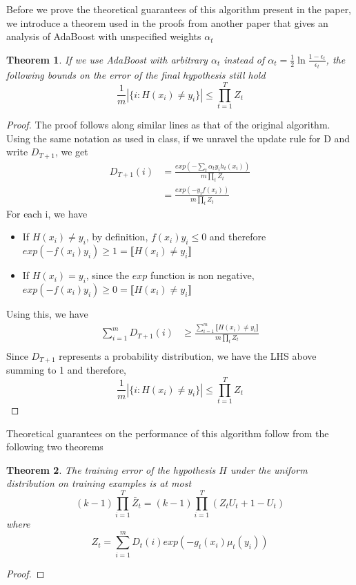 \documentclass[11pt]{article}
\newtheorem{theorem}{Theorem}
\begin{document}
Before we prove the theoretical guarantees of this algorithm present in the paper, we introduce a theorem used in the proofs from another paper that gives an analysis of AdaBoost with unspecified weights $\alpha_t$ \cite{Schapire:1999:IBA:337859.337870}
\begin{theorem}
If we use AdaBoost with arbitrary $\alpha_t$ instead of $\alpha_t = \frac{1}{2} \ln \frac{1-\epsilon_t}{\epsilon_t}$, the following bounds on the error of the final hypothesis still hold
$$\frac{1}{m}|\{i : H(x_i) \neq y_i\}| \le \prod_{t=1}^T Z_t$$
\end{theorem}
\begin{proof}
The proof follows along similar lines as that of the original algorithm. Using the same notation as used in class, if we unravel the update rule for D and write $D_{T+1}$, we get
\begin{align*}
D_{T+1}(i) &= \frac{exp(-\sum_t \alpha_t y_i h_t(x_i))}{m\prod_t Z_t}\\
&= \frac{exp(-y_i f(x_i))}{m \prod_t Z_t}
\end{align*}
For each i, we have
\begin{itemize}
\item If $H(x_i) \neq y_i$, by definition, $f(x_i) y_i \leq 0$ and therefore $exp(-f(x_i) y_i) \ge 1 = \llbracket H(x_i) \neq y_i \rrbracket$
\item If $H(x_i) = y_i$, since the $exp$ function is non negative, $exp(-f(x_i) y_i) \ge 0 = \llbracket H(x_i) \neq y_i \rrbracket$
\end{itemize}
Using this, we have
\begin{align*}
\sum_{i=1}^m D_{T+1}(i) &\ge \frac{\sum_{i=1}^m \llbracket H(x_i) \neq y_i \rrbracket}{m\prod_t Z_t}\\ 
\end{align*}
Since $D_{T+1}$ represents a probability distribution, we have the LHS above summing to 1 and therefore,
$$\frac{1}{m}|\{i : H(x_i) \neq y_i\}| \le \prod_{t=1}^T Z_t$$
\end{proof}
Theoretical guarantees on the performance of this algorithm follow from the following two theorems
\begin{theorem}
The training error of the hypothesis $H$ under the uniform distribution on training examples is at most $$(k-1)\prod_{i=1}^T \bar Z_t = (k-1)\prod_{i=1}^T (Z_t U_t + 1-U_t)$$ where $$Z_t = \sum_{i=1}^m D_t(i) exp(-g_t(x_i)\mu_t(y_i))$$
\end{theorem}
\begin{proof}

\end{proof}
\end{document}
